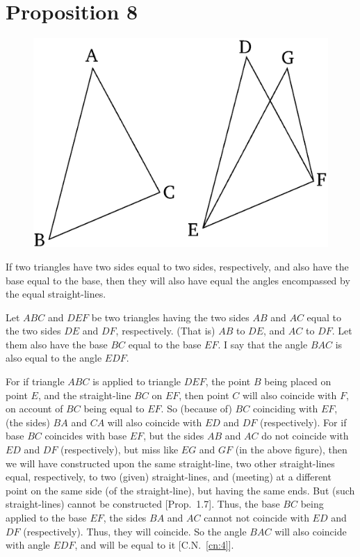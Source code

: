 \chapter*{Proposition 8}
\label{prop:8}

\begin{figure}[ht]
    \begin{center}
    \includegraphics[width=0.5\linewidth]{figures/fig08e.eps}
    \label{fig:prop_8}
    \end{center}
\end{figure}

If two triangles have  two sides equal to two sides, respectively, 
and also have the base equal to the base, then they will
also have equal the angles  encompassed by
the equal straight-lines.

Let $ABC$ and $DEF$ be two triangles having the two sides $AB$ and $AC$ equal to the two
sides $DE$ and $DF$, respectively. (That is) $AB$ to $DE$, and $AC$ to $DF$.  Let them also have
the base $BC$ equal to the base $EF$. I say that the angle $BAC$ is also equal
to the angle $EDF$.

For if triangle $ABC$ is applied to triangle $DEF$, the point $B$ being placed on
point $E$, and the straight-line $BC$ on $EF$, then point $C$ will also coincide with $F$, on
account of $BC$ being equal to $EF$.
So  (because of) $BC$ coinciding with $EF$,  (the sides) $BA$ and $CA$ will also
coincide with  $ED$ and $DF$ (respectively). 
For if base $BC$ coincides with base $EF$, but the sides $AB$ and $AC$ 
do not coincide with $ED$ and $DF$ (respectively), but miss like $EG$
and $GF$ (in the above figure), 
then we will have constructed upon the same straight-line, two other straight-lines equal, respectively, to two (given) straight-lines,  and (meeting)
at a different point on the same
side (of the straight-line), but having the same ends. But (such straight-lines) cannot be constructed [Prop.~1.7].
Thus,  the base $BC$ being applied to the  base $EF$,  the sides $BA$ and $AC$
cannot not coincide with $ED$ and $DF$ (respectively). Thus, they
will coincide. So the angle $BAC$ will also coincide with angle $EDF$,
and will be equal to it [C.N.~\ref{cn:4}].

